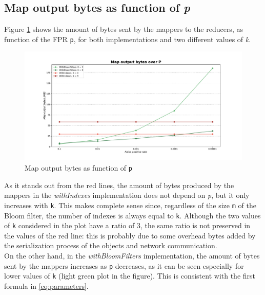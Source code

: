 \subsection*{Map output bytes as function of \textit{p}}

Figure \ref{fig:MapOutputBytesP} shows the amount of bytes sent by the mappers to the reducers, as function of the FPR \texttt{p}, for both implementations and two different values of \textit{k}.\\

\begin{figure}[H]
    \begin{center}
        \includegraphics[scale=.45,trim={3cm 0 3cm 0},clip]{img/MapOutputBytesP.pdf}
    \end{center}
    \vspace*{-0.5cm}
    \caption{Map output bytes as function of \texttt{p}}
    \label{fig:MapOutputBytesP}
\end{figure}

\noindent As it stands out from the red lines, the amount of bytes produced by the mappers in the \textit{withIndexes} implementation does not depend on \textit{p}, but it only increases with \texttt{k}. This makes complete sense since, regardless of the size \texttt{m} of the Bloom filter, the number of indexes is always equal to \texttt{k}. Although the two values of \texttt{k} considered in the plot have a ratio of 3, the same ratio is not preserved in the values of the red line: this is probably due to some overhead bytes added by the serialization process of the objects and network communication.\\
On the other hand, in the \textit{withBloomFilters} implementation, the amount of bytes sent by the mappers increases as \texttt{p} decreases, as it can be seen especially for lower values of \texttt{k} (light green plot in the figure). This is consistent with the first formula in \ref{eq:parameters}.

